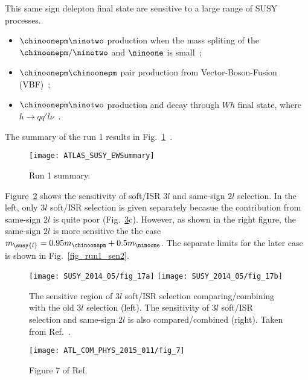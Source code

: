 This same sign delepton final state are sensitive to a large range of SUSY processes.
\begin{itemize}
  \item $\chinoonepm\ninotwo$ production when the mass spliting of the $\chinoonepm/\ninotwo$ and $\ninoone$ is small~\cite{Aad:2015eda};
  \item $\chinoonepm\chinoonepm$ pair production from Vector-Boson-Fusion (VBF)~\cite{Aad:2015eda};
  \item $\chinoonepm\ninotwo$ production and decay through $Wh$ final state, where $h\to qq'l\nu$~\cite{Aad:2015jqa}.
  \end{itemize}

The summary of the run 1 results in Fig.~\ref{fig_run1_ew_results}~\cite{susyRun1Summary}.
\begin{figure}[h]
  \centering
  \texttt{[image: ATLAS\_SUSY\_EWSummary]}
  \caption{Run 1 summary.}
  \label{fig_run1_ew_results}
\end{figure}

Figure~\ref{fig_run1_soft3l_ss2l} shows the sensitivity of soft/ISR $3l$ and same-sign $2l$ selection. In the left, only $3l$ soft/ISR selection is given separately becasue the contribution from same-sign $2l$ is quite poor (Fig.~\ref{fig_run1_sen1}c). However, as shown in the right figure, the same-sign $2l$ is more sensitive the the case $m_{\susy{l}}=0.95m_{\chinoonepm}+0.5m_{\ninoone}$. The separate limits for the later case is shown in Fig.~\ref{fig_run1_sen2}.
\begin{figure}
  \centering
  \texttt{[image: SUSY\_2014\_05/fig\_17a]}
  \texttt{[image: SUSY\_2014\_05/fig\_17b]}
  \caption{The sensitive region of $3l$ soft/ISR selection comparing/combining with the old $3l$ selection (left). The sensitivity of $3l$ soft/ISR selection and same-sign $2l$ is also compared/combined (right). Taken from Ref.~\cite{Aad:2015eda}.}
  \label{fig_run1_soft3l_ss2l}
\end{figure}



\begin{figure}
  \centering
  \texttt{[image: ATL\_COM\_PHYS\_2015\_011/fig\_7]}
  \caption{Figure 7 of Ref.~\cite{Grout:1981548}}
\label{fig_run1_sen1}
\end{figure}

